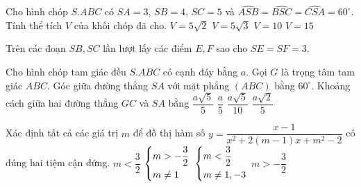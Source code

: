 \begin{ex}%
Cho hình chóp $S.ABC$ có $SA=3$, $SB=4$, $SC=5$ và $\widehat{ASB}=\widehat{BSC}=\widehat{CSA}=60^\circ$. Tính thể tích $V$ của khối chóp đã cho.
\choice
{\True $V=5\sqrt{2}$}
{$V=5\sqrt{3}$}
{$V=10$}
{$V=15$}
\loigiai
{Trên các đoạn $SB,SC$ lần lượt lấy các điểm $E,F$ sao cho $SE=SF=3$.\\
{
}	
}
\end{ex}


\begin{ex}%
Cho hình chóp tam giác đều $S.ABC$ có cạnh đáy bằng $a$. Gọi $G$ là trọng tâm tam giác $ABC$. Góc giữa đường thẳng $SA$ với mặt phẳng $(ABC)$ bằng $60^\circ$. Khoảng cách giữa hai đường thẳng $GC$ và $SA$ bằng
\choice
{\True $\dfrac{a\sqrt{5}}{5}$}
{$\dfrac{a}{5}$}
{$\dfrac{a\sqrt{5}}{10}$}
{$\dfrac{a\sqrt{2}}{5}$}
\end{ex}



\begin{ex}%
Xác định tất cả các giá trị $m$ để đồ thị hàm số $y=\dfrac{x-1}{x^2+2(m-1)x+m^2-2}$ có đúng hai tiệm cận đứng.
\choice
{$m<\dfrac{3}{2}$}
{$\left\{\begin{aligned}&m>-\dfrac{3}{2}\\&m\neq 1\end{aligned}\right.$}
{\True $\left\{\begin{aligned}&m<\dfrac{3}{2}\\&m\neq 1, -3\end{aligned}\right.$}
{$m>-\dfrac{3}{2}$}
\end{ex}

